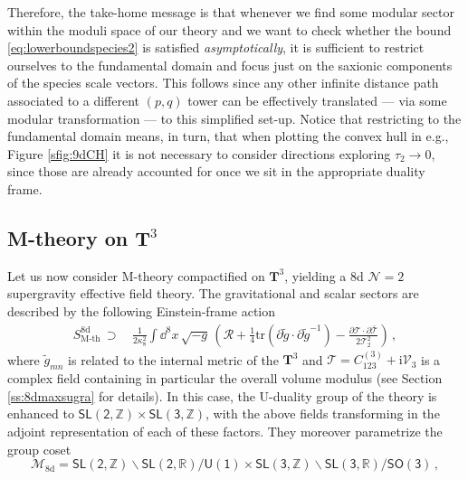 Therefore, the take-home message is that whenever we find some modular sector within the moduli space of our theory and we want to check whether the bound \eqref{eq:lowerboundspecies2} is satisfied \emph{asymptotically}, it is sufficient to restrict ourselves to the fundamental domain and focus just on the saxionic components of the species scale vectors. This follows since any other infinite distance path associated to a different $(p,q)$ tower can be effectively translated --- via some modular transformation --- to this simplified set-up. Notice that restricting to the fundamental domain means, in turn, that when plotting the convex hull in e.g., Figure \ref{sfig:9dCH} it is not necessary to consider directions exploring $\tau_2 \to 0$, since those are already accounted for once we sit in the appropriate duality frame.

\subsection{M-theory on $\mathbf{T}^3$}
\label{ss:MthyT3SSDC}

Let us now consider M-theory compactified on $\mathbf{T}^3$, yielding a 8d $\mathcal N=2$ supergravity effective field theory. The gravitational and scalar sectors are described by the following Einstein-frame action
%
\begin{align}\label{eq:8d}
	S_\text{M-th}^{\text{8d}}\, \supset\, &\frac{1}{2\kappa_8^2} \int \dd^{8}x\, \sqrt{-g}\,  \left( \mathcal{R} + \frac{1}{4} \text{tr} \left( \partial \tilde{g} \cdot \partial \tilde{g}^{-1} \right) -\frac{\partial \mathcal{T} \cdot \partial \bar{\mathcal{T}}}{2 \mathcal{T}_2^2} \right)\, ,
\end{align}
%
where $\tilde{g}_{m n}$ is related to the internal metric of the $\mathbf{T}^3$ and $\mathcal{T}=C_{123}^{(3)} + \text{i} \mathcal{V}_3$ is a complex field containing in particular the overall volume modulus (see Section \ref{ss:8dmaxsugra} for details). In this case, the U-duality group of the theory is enhanced to $\mathsf{SL(2, \mathbb{Z})} \times \mathsf{SL(3, \mathbb{Z})}$, with the above fields transforming in the adjoint representation of each of these factors. They moreover parametrize the group coset 
%
\begin{equation}\label{eq:8dmodspaceSSDC}
 \mathcal{M}_{\text{8d}}=\mathsf{SL(2, \mathbb{Z})}\backslash \mathsf{SL(2, \mathbb{R})}/\mathsf{U(1)} \times \mathsf{SL(3, \mathbb{Z})}\backslash \mathsf{SL(3, \mathbb{R})}/\mathsf{SO(3)}\, ,
\end{equation}
%

